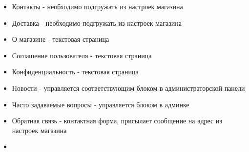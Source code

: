 \documentclass[DIV=calc, paper=a4, fontsize=11pt]{scrartcl} %
\begin{document}
\begin{itemize}
	\item Контакты - необходимо подгружать из настроек магазина
	\item Доставка - необходимо подгружать из настроек магазина
	\item О магазине - текстовая страница
	\item Соглашение пользователя - текстовая страница
	\item Конфиденциальность - текстовая страница
	\item Новости - управляется соответствующим блоком в администраторской панели
	\item Часто задаваемые вопросы - управляется блоком в админке
	\item Обратная связь - контактная форма, присылает сообщение на адрес из настроек магазина
	\item 
\end{itemize}
\end{document}

